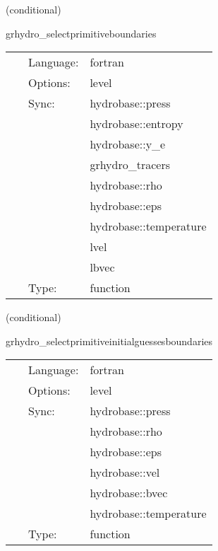\documentclass{article}
\begin{document}
\vspace{5mm}

   (conditional) 

\hspace{5mm} grhydro\_selectprimitiveboundaries 

\hspace{5mm}{\it select primitive variables for boundary conditions } 


\hspace{5mm}

 \begin{tabular*}{160mm}{cll} 
~ & Language:  & fortran \\ 
~ & Options:  & level \\ 
~ & Sync:  & hydrobase::press \\ 
~& ~ &hydrobase::entropy\\ 
~& ~ &hydrobase::y\_e\\ 
~& ~ &grhydro\_tracers\\ 
~& ~ &hydrobase::rho\\ 
~& ~ &hydrobase::eps\\ 
~& ~ &hydrobase::temperature\\ 
~& ~ &lvel\\ 
~& ~ &lbvec\\ 
~ & Type:  & function \\ 
\end{tabular*} 


\vspace{5mm}

   (conditional) 

\hspace{5mm} grhydro\_selectprimitiveinitialguessesboundaries 

\hspace{5mm}{\it select initial guess primitive variables for boudary conditions } 


\hspace{5mm}

 \begin{tabular*}{160mm}{cll} 
~ & Language:  & fortran \\ 
~ & Options:  & level \\ 
~ & Sync:  & hydrobase::press \\ 
~& ~ &hydrobase::rho\\ 
~& ~ &hydrobase::eps\\ 
~& ~ &hydrobase::vel\\ 
~& ~ &hydrobase::bvec\\ 
~& ~ &hydrobase::temperature\\ 
~ & Type:  & function \\ 
\end{tabular*} 
\end{document}
